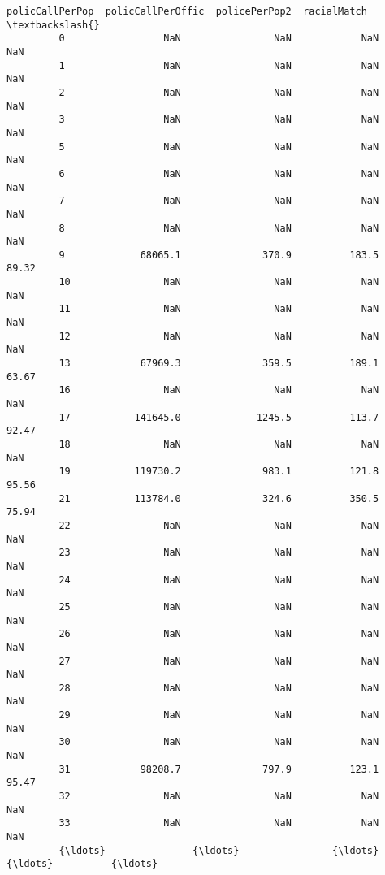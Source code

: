 \documentclass[11pt]{llncs}
\begin{document}
\begin{Verbatim}[commandchars=\\\{\}]
               policCallPerPop  policCallPerOffic  policePerPop2  racialMatch  \textbackslash{}
         0                 NaN                NaN            NaN          NaN   
         1                 NaN                NaN            NaN          NaN   
         2                 NaN                NaN            NaN          NaN   
         3                 NaN                NaN            NaN          NaN   
         5                 NaN                NaN            NaN          NaN   
         6                 NaN                NaN            NaN          NaN   
         7                 NaN                NaN            NaN          NaN   
         8                 NaN                NaN            NaN          NaN   
         9             68065.1              370.9          183.5        89.32   
         10                NaN                NaN            NaN          NaN   
         11                NaN                NaN            NaN          NaN   
         12                NaN                NaN            NaN          NaN   
         13            67969.3              359.5          189.1        63.67   
         16                NaN                NaN            NaN          NaN   
         17           141645.0             1245.5          113.7        92.47   
         18                NaN                NaN            NaN          NaN   
         19           119730.2              983.1          121.8        95.56   
         21           113784.0              324.6          350.5        75.94   
         22                NaN                NaN            NaN          NaN   
         23                NaN                NaN            NaN          NaN   
         24                NaN                NaN            NaN          NaN   
         25                NaN                NaN            NaN          NaN   
         26                NaN                NaN            NaN          NaN   
         27                NaN                NaN            NaN          NaN   
         28                NaN                NaN            NaN          NaN   
         29                NaN                NaN            NaN          NaN   
         30                NaN                NaN            NaN          NaN   
         31            98208.7              797.9          123.1        95.47   
         32                NaN                NaN            NaN          NaN   
         33                NaN                NaN            NaN          NaN   
         {\ldots}               {\ldots}                {\ldots}            {\ldots}          {\ldots}   

\end{Verbatim}
\end{document}
